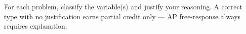 \documentclass[10pt]{article}
\begin{document}
\namedateperiod

\vspace{0.1in}

\begin{tcolorbox}[colback=sky, colframe=navy, boxrule=0.8pt, arc=2mm,
    left=3mm, right=3mm, top=1.5mm, bottom=1.5mm]
\small For each problem, classify the variable(s) and justify your reasoning.
A correct type with no justification earns partial credit only ---
AP free-response always requires explanation.
\end{tcolorbox}

\vspace{0.14in}

\end{document}
